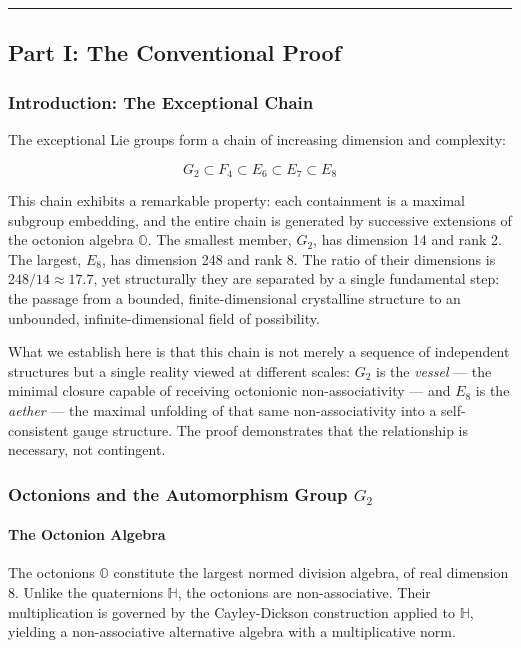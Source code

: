 \documentclass[12pt,a4paper]{article}
\begin{document}
\begin{center}
\rule{0.5\textwidth}{0.4pt}
\end{center}

\subsection{Part I: The Conventional Proof}

\subsubsection{Introduction: The Exceptional Chain}

The exceptional Lie groups form a chain of increasing dimension and complexity:

\[G_2 \subset F_4 \subset E_6 \subset E_7 \subset E_8\]

This chain exhibits a remarkable property: each containment is a maximal subgroup embedding, and the entire chain is generated by successive extensions of the octonion algebra $\mathbb{O}$. The smallest member, $G_2$, has dimension 14 and rank 2. The largest, $E_8$, has dimension 248 and rank 8. The ratio of their dimensions is $248/14 \approx 17.7$, yet structurally they are separated by a single fundamental step: the passage from a bounded, finite-dimensional crystalline structure to an unbounded, infinite-dimensional field of possibility.

What we establish here is that this chain is not merely a sequence of independent structures but a single reality viewed at different scales: $G_2$ is the \emph{vessel} --- the minimal closure capable of receiving octonionic non-associativity --- and $E_8$ is the \emph{aether} --- the maximal unfolding of that same non-associativity into a self-consistent gauge structure. The proof demonstrates that the relationship is necessary, not contingent.

\subsubsection{Octonions and the Automorphism Group $G_2$}

\paragraph{The Octonion Algebra}

The octonions $\mathbb{O}$ constitute the largest normed division algebra, of real dimension 8. Unlike the quaternions $\mathbb{H}$, the octonions are non-associative. Their multiplication is governed by the Cayley-Dickson construction applied to $\mathbb{H}$, yielding a non-associative alternative algebra with a multiplicative norm.
\end{document}
